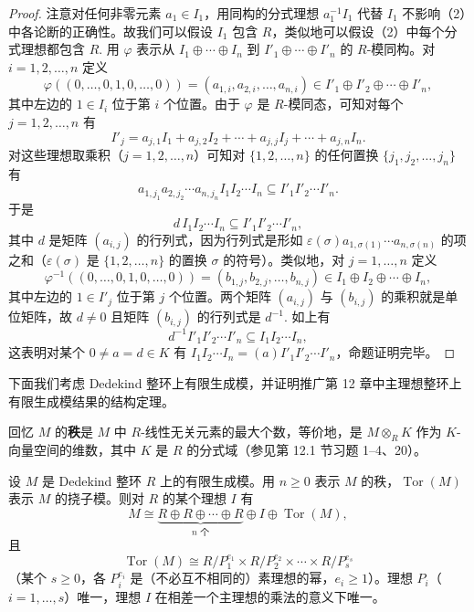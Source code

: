 \begin{proof}
注意对任何非零元素 \(a_1 \in I_1\)，用同构的分式理想 \(a_1^{-1}I_1\) 代替 \(I_1\) 不影响（2）中各论断的正确性。故我们可以假设 \(I_1\) 包含 \(R\)，类似地可以假设（2）中每个分式理想都包含 \(R\). 用 \(\varphi\) 表示从 \(I_1 \oplus \cdots \oplus I_n\) 到 \(I'_1 \oplus \cdots \oplus I'_n\) 的 \(R\)-模同构。对 \(i = 1, 2, \ldots, n\) 定义
\[
\varphi((0, \ldots, 0, 1, 0, \ldots, 0)) = (a_{1,i}, a_{2,i}, \ldots, a_{n,i}) \in I'_1 \oplus I'_2 \oplus \cdots \oplus I'_n,
\]
其中左边的 \(1 \in I_i\) 位于第 \(i\) 个位置。由于 \(\varphi\) 是 \(R\)-模同态，可知对每个 \(j = 1, 2, \ldots, n\) 有
\[
I'_j = a_{j,1}I_1+a_{j,2}I_2+\cdots+a_{j,j}I_j+\cdots+a_{j,n}I_n.
\]
对这些理想取乘积（\(j = 1, 2, \ldots, n\)）可知对 \(\{1, 2, \ldots, n\}\) 的任何置换 \(\{j_1, j_2, \ldots, j_n\}\) 有
\[
a_{1,j_1}a_{2,j_2}\cdots a_{n,j_n}I_1I_2\cdots I_n \subseteq I'_1I'_2\cdots I'_n.
\]
于是
\[
d\,I_1I_2\cdots I_n \subseteq I'_1I'_2\cdots I'_n,
\]
其中 \(d\) 是矩阵 \((a_{i,j})\) 的行列式，因为行列式是形如 \(\varepsilon(\sigma)a_{1,\sigma(1)}\cdots a_{n,\sigma(n)}\) 的项之和（\(\varepsilon(\sigma)\) 是 \(\{1,2,\ldots,n\}\) 的置换 \(\sigma\) 的符号）。类似地，对 \(j = 1, \ldots, n\) 定义
\[
\varphi^{-1}((0, \ldots, 0, 1, 0, \ldots, 0)) = (b_{1,j}, b_{2,j}, \ldots, b_{n,j}) \in I_1 \oplus I_2 \oplus \cdots \oplus I_n,
\]
其中左边的 \(1 \in I'_j\) 位于第 \(j\) 个位置。两个矩阵 \((a_{i,j})\) 与 \((b_{i,j})\) 的乘积就是单位矩阵，故 \(d \neq 0\) 且矩阵 \((b_{i,j})\) 的行列式是 \(d^{-1}\). 如上有
\[
d^{-1}I'_1I'_2\cdots I'_n \subseteq I_1I_2\cdots I_n,
\]
这表明对某个 \(0 \neq a = d \in K\) 有 \(I_1I_2\cdots I_n = (a)I'_1I'_2\cdots I'_n\)，命题证明完毕。
\end{proof}

下面我们考虑 Dedekind 整环上有限生成模，并证明推广第 12 章中主理想整环上有限生成模结果的结构定理。

回忆 \(M\) 的\textbf{秩}是 \(M\) 中 \(R\)-线性无关元素的最大个数，等价地，是 \(M \otimes_RK\) 作为 \(K\)-向量空间的维数，其中 \(K\) 是 \(R\) 的分式域（参见第 12.1 节习题 1--4、20）。

\begin{theorem}\label{thm:16.22}
设 \(M\) 是 Dedekind 整环 \(R\) 上的有限生成模。用 \(n \geq 0\) 表示 \(M\) 的秩，\(\operatorname{Tor}(M)\) 表示 \(M\) 的挠子模。则对 \(R\) 的某个理想 \(I\) 有
\[
M \cong \underbrace{R \oplus R \oplus \cdots \oplus R}_{n \text{ 个}} \oplus I \oplus \operatorname{Tor}(M),
\]
且
\[
\operatorname{Tor}(M) \cong R/P_1^{e_1} \times R/P_2^{e_2} \times \cdots \times R/P_s^{e_s}
\]
（某个 \(s \geq 0\)，各 \(P_i^{e_i}\) 是（不必互不相同的）素理想的幂，\(e_i \geq 1\)）。理想 \(P_i\)（\(i = 1, \ldots, s\)）唯一，理想 \(I\) 在相差一个主理想的乘法的意义下唯一。
\end{theorem}

